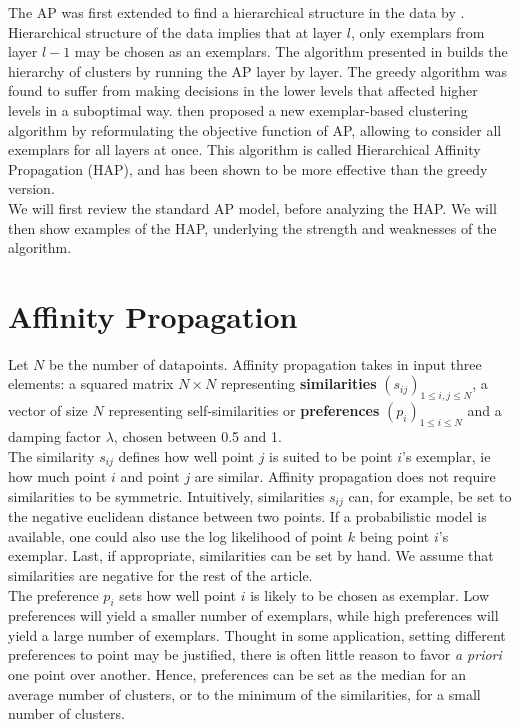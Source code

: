 \documentclass{ipol}
\begin{document}
The AP was first extended to find a hierarchical structure in the data by
\cite{Xiao07jointaffinity}. Hierarchical structure of the data implies that at
layer $l$, only exemplars from layer $l - 1$ may be chosen as an exemplars.
The algorithm presented in \cite{Xiao07jointaffinity} builds the hierarchy of
clusters by running the AP layer by layer. The greedy algorithm was found to
suffer from making decisions in the lower levels that affected higher levels
in a suboptimal way. \cite{hap} then proposed a new exemplar-based clustering
algorithm by reformulating the objective function of AP, allowing to consider
all exemplars for all layers at once. This algorithm is called Hierarchical
Affinity Propagation (HAP), and has been shown to be more effective than the
greedy version. \\

We will first review the standard AP model, before analyzing the HAP. We will
then show examples of the HAP, underlying the strength and weaknesses of the
algorithm.

\section{Affinity Propagation}

Let $N$ be the number of datapoints. Affinity propagation takes in input three
elements: a squared matrix $N \times N$ representing \textbf{similarities}
$(s_{ij})_{1 \leq i, j \leq N}$, a vector of size $N$ representing
self-similarities or \textbf{preferences} $(p_i)_{1 \leq i \leq N}$ and a
damping factor $\lambda$, chosen between 0.5 and 1. \\

The similarity $s_{ij}$ defines how well point $j$ is suited to be point $i$'s
exemplar, ie how much point $i$ and point $j$ are similar. Affinity
propagation does not require similarities to be symmetric. Intuitively,
similarities $s_{ij}$ can, for example, be set to the negative euclidean
distance between two points. If a probabilistic model is available, one could
also use the log likelihood of point $k$ being point $i$'s exemplar. Last, if
appropriate, similarities can be set by hand. We assume that similarities are
negative for the rest of the article.\\

The preference $p_i$ sets how well point $i$ is likely to be chosen as
exemplar. Low preferences will yield a smaller number of exemplars, while high
preferences will yield a large number of exemplars. Thought in some
application, setting different preferences to point may be justified, there is
often little reason to favor \textit{a priori} one point over another. Hence,
preferences can be set as the median for an average number of clusters, or to
the minimum of the similarities, for a small number of clusters. \\
\end{document}
